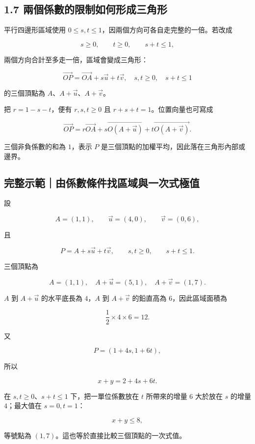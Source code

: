 \documentclass[11pt,a4paper]{article}
\begin{document}
\clearpage

\subsection{1.7 兩個係數的限制如何形成三角形}\label{ux5169ux500bux4fc2ux6578ux7684ux9650ux5236ux5982ux4f55ux5f62ux6210ux4e09ux89d2ux5f62}

平行四邊形區域使用 \(0\le s,t\le1\)，因兩個方向可各自走完整的一倍。若改成

\[
s\ge0,
\qquad
t\ge0,
\qquad
s+t\le1,
\]

兩個方向合計至多走一倍，區域會變成三角形：

\[
\overrightarrow{OP}
=\overrightarrow{OA}+s\vec u+t\vec v,
\quad
s,t\ge0,
\quad
s+t\le1
\]

的三個頂點為 \(A\)、\(A+\vec u\)、\(A+\vec v\)。

把 \(r=1-s-t\)，便有 \(r,s,t\ge0\) 且 \(r+s+t=1\)。位置向量也可寫成

\[
\overrightarrow{OP}
=r\overrightarrow{OA}
+s\overrightarrow{O(A+\vec u)}
+t\overrightarrow{O(A+\vec v)}.
\]

三個非負係數的和為 \(1\)，表示 \(P\) 是三個頂點的加權平均，因此落在三角形內部或邊界。

\begin{HandoutWorkedExample}

\subsection{完整示範｜由係數條件找區域與一次式極值}\label{ux5b8cux6574ux793aux7bc4ux7531ux4fc2ux6578ux689dux4ef6ux627eux5340ux57dfux8207ux4e00ux6b21ux5f0fux6975ux503c}

設

\[
A=(1,1),
\qquad
\vec u=(4,0),
\qquad
\vec v=(0,6),
\]

且

\[
P=A+s\vec u+t\vec v,
\qquad
s,t\ge0,
\qquad
s+t\le1.
\]

三個頂點為

\[
A=(1,1),
\quad
A+\vec u=(5,1),
\quad
A+\vec v=(1,7).
\]

\(A\) 到 \(A+\vec u\) 的水平底長為 \(4\)，\(A\) 到 \(A+\vec v\) 的鉛直高為 \(6\)，因此區域面積為

\[
\frac12\times4\times6=\boxed{12}.
\]

又

\[
P=(1+4s,1+6t),
\]

所以

\[
x+y=2+4s+6t.
\]

在 \(s,t\ge0\)、\(s+t\le1\) 下，把一單位係數放在 \(t\) 所帶來的增量 \(6\) 大於放在 \(s\) 的增量 \(4\)；最大值在 \(s=0,t=1\)：

\[
\boxed{x+y\le8},
\]

等號點為 \(\boxed{(1,7)}\)。這也等於直接比較三個頂點的一次式值。

\end{HandoutWorkedExample}
\end{document}

